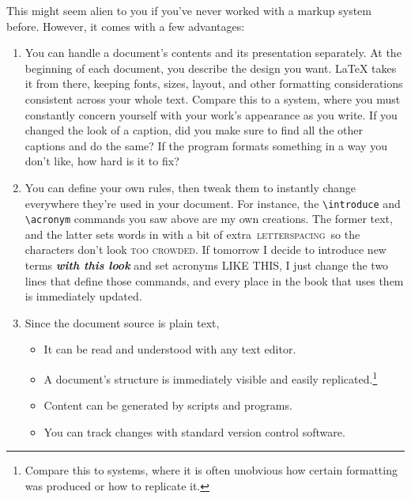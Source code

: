 This might seem alien to you if you've never worked with a markup system before.
However, it comes with a few advantages:
\begin{enumerate}
\item You can handle a document's contents and its presentation separately.
    At the beginning of each document,
    you describe the design you want.
    \LaTeX{} takes it from there,
    keeping fonts, sizes, layout,
    and other formatting considerations consistent across your
    whole text.
    Compare this to a  system,
    where you must constantly concern yourself with your work's appearance
    as you write.
    If you changed the look of a caption,
    did you make sure to find all the other captions and do the
    same?
    If the program formats something in a way you don't like,
    how hard is it to fix?%
\clearpage

\item You can define your own rules, then tweak them to instantly change
    everywhere they're used in your document.
    For instance, the \verb|\introduce| and \verb|\acronym| commands you saw above
    are my own creations. The former  text, and
    the latter sets words in  with a bit of extra
    \,\textsc{letterspacing}\, so the characters
    don't look \textsc{too crowded}.
    If tomorrow I decide to introduce new terms
    \textbf{\itshape with this look} and set acronyms
    {\small{} LIKE THIS},
    I just change the two lines that define those commands,
    and every place in the book that uses them is immediately updated.

\item Since the document source is plain text,
    \begin{itemize}
    \item It can be read and understood with any text editor.
    \item A document's structure is immediately visible
        and easily replicated.\punckern\footnote{Compare this to
         systems, where it is often unobvious
        how certain formatting was produced or how to replicate it.}
    \item Content can be generated by scripts and programs.
    \item You can track changes with standard version control software.
    \end{itemize}
\end{enumerate}


